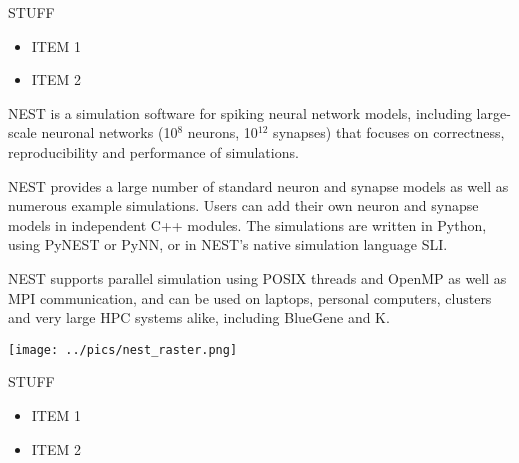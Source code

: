 \begin{multicols}{3}

STUFF

\begin{itemize}[nolistsep,topsep=0em,leftmargin=1pc]
\item ITEM 1
\item ITEM 2
\end{itemize}


NEST is a simulation software for spiking neural network models,
including large-scale neuronal networks (10$^8$ neurons, 10$^{12}$
synapses) that focuses on correctness, reproducibility and performance
of simulations.

NEST provides a large number of standard neuron and synapse models as
well as numerous example simulations. Users can add their own neuron and
synapse models in independent C++ modules. The simulations are written
in Python, using PyNEST or PyNN, or in NEST's native simulation language
SLI.

NEST supports parallel simulation using POSIX threads and OpenMP as well
as MPI communication, and can be used on laptops, personal computers,
clusters and very large HPC systems alike, including BlueGene and K.

\begin{center}
\texttt{[image: ../pics/nest\_raster.png]}
\end{center}


STUFF

\begin{itemize}[nolistsep,topsep=0em,leftmargin=1pc]
\item ITEM 1
\item ITEM 2
\end{itemize}





\end{multicols}
